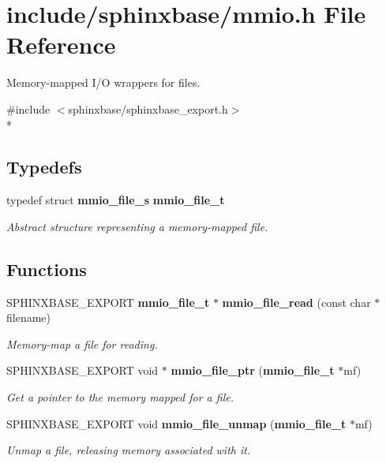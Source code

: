 \section{include/sphinxbase/mmio.h File Reference}
\label{mmio_8h}


Memory-\/mapped I/\+O wrappers for files.  


{\ttfamily \#include $<$sphinxbase/sphinxbase\+\_\+export.\+h$>$}\\*
\subsection*{Typedefs}
\begin{DoxyCompactItemize}
\item 
typedef struct {\bf mmio\+\_\+file\+\_\+s} {\bf mmio\+\_\+file\+\_\+t}\label{mmio_8h_ae27ed04d8142d77aae885c8cb8c9fa3b}

\begin{DoxyCompactList}\small\item\em Abstract structure representing a memory-\/mapped file. \end{DoxyCompactList}\end{DoxyCompactItemize}
\subsection*{Functions}
\begin{DoxyCompactItemize}
\item 
S\+P\+H\+I\+N\+X\+B\+A\+S\+E\+\_\+\+E\+X\+P\+O\+R\+T {\bf mmio\+\_\+file\+\_\+t} $\ast$ {\bf mmio\+\_\+file\+\_\+read} (const char $\ast$filename)
\begin{DoxyCompactList}\small\item\em Memory-\/map a file for reading. \end{DoxyCompactList}\item 
S\+P\+H\+I\+N\+X\+B\+A\+S\+E\+\_\+\+E\+X\+P\+O\+R\+T void $\ast$ {\bf mmio\+\_\+file\+\_\+ptr} ({\bf mmio\+\_\+file\+\_\+t} $\ast$mf)\label{mmio_8h_a5e6d8bf5cd7785563abc18c70a31ce0d}

\begin{DoxyCompactList}\small\item\em Get a pointer to the memory mapped for a file. \end{DoxyCompactList}\item 
S\+P\+H\+I\+N\+X\+B\+A\+S\+E\+\_\+\+E\+X\+P\+O\+R\+T void {\bf mmio\+\_\+file\+\_\+unmap} ({\bf mmio\+\_\+file\+\_\+t} $\ast$mf)\label{mmio_8h_a341a9c1cc8a3c4bddfd2d29a1b0993f6}

\begin{DoxyCompactList}\small\item\em Unmap a file, releasing memory associated with it. \end{DoxyCompactList}\end{DoxyCompactItemize}



